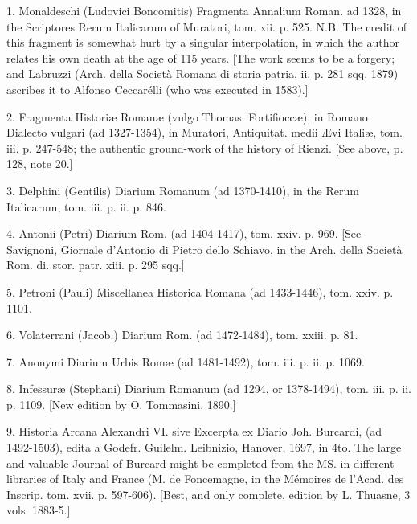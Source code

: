 {1. Monaldeschi (Ludovici Boncomitis) Fragmenta Annalium Roman. ad 1328, in the Scriptores Rerum Italicarum of Muratori, tom. xii. p. 525. N.B. The credit of this fragment is somewhat hurt by a singular interpolation, in which the author relates his own death at the age of 115 years. [The work seems to be a forgery; and Labruzzi (Arch. della Società Romana di storia patria, ii. p. 281 sqq. 1879) ascribes it to Alfonso Ceccarélli (who was executed in 1583).]

2. Fragmenta Historiæ Romanæ (vulgo Thomas. Fortifioccæ), in Romano Dialecto vulgari (ad 1327-1354), in Muratori, Antiquitat. medii Ævi Italiæ, tom. iii. p. 247-548; the authentic ground-work of the history of Rienzi. [See above, p. 128, note 20.]

3. Delphini (Gentilis) Diarium Romanum (ad 1370-1410), in the Rerum Italicarum, tom. iii. p. ii. p. 846.

4. Antonii (Petri) Diarium Rom. (ad 1404-1417), tom. xxiv. p. 969. [See Savignoni, Giornale d\texthebrew{}’Antonio di Pietro dello Schiavo, in the Arch. della Società Rom. di. stor. patr. xiii. p. 295 sqq.]

5. Petroni (Pauli) Miscellanea Historica Romana (ad 1433-1446), tom. xxiv. p. 1101.

6. Volaterrani (Jacob.) Diarium Rom. (ad 1472-1484), tom. xxiii. p. 81.

7. Anonymi Diarium Urbis Romæ (ad 1481-1492), tom. iii. p. ii. p. 1069.

8. Infessuræ (Stephani) Diarium Romanum (ad 1294, or 1378-1494), tom. iii. p. ii. p. 1109. [New edition by O. Tommasini, 1890.]

9. Historia Arcana Alexandri VI. sive Excerpta ex Diario Joh. Burcardi, (ad 1492-1503), edita a Godefr. Guilelm. Leibnizio, Hanover, 1697, in 4to. The large and valuable Journal of Burcard might be completed from the MS. in different libraries of Italy and France (M. de Foncemagne, in the Mémoires de l\texthebrew{}’Acad. des Inscrip. tom. xvii. p. 597-606). [Best, and only complete, edition by L. Thuasne, 3 vols. 1883-5.]

}
